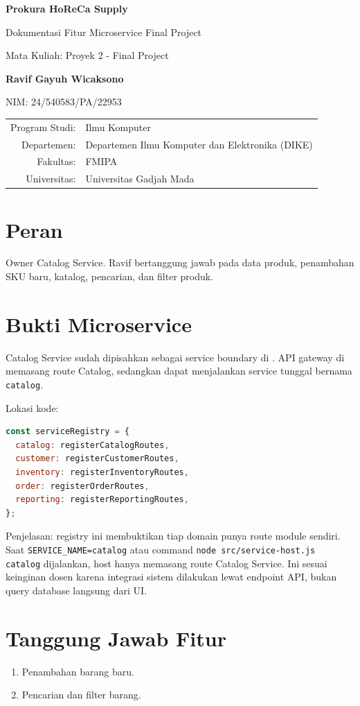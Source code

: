 \documentclass[11pt,a4paper]{article}
\newcommand{\docheader}[2]{
\begin{titlepage}
\centering
{\Large\bfseries Prokura HoReCa Supply\par}
\vspace{0.4cm}
{\large Dokumentasi Fitur Microservice Final Project\par}
\vspace{0.8cm}
{\large Mata Kuliah: Proyek 2 - Final Project\par}
\vspace{1.2cm}
{\large\bfseries #1\par}
{\large NIM: #2\par}
\vfill
\begin{tabular}{rl}
Program Studi: & Ilmu Komputer\\
Departemen: & Departemen Ilmu Komputer dan Elektronika (DIKE)\\
Fakultas: & FMIPA\\
Universitas: & Universitas Gadjah Mada\\
\end{tabular}
\vfill
\end{titlepage}
}
\begin{document}
\docheader{Ravif Gayuh Wicaksono}{24/540583/PA/22953}

\section*{Peran}
Owner Catalog Service. Ravif bertanggung jawab pada data produk, penambahan SKU baru, katalog, pencarian, dan filter produk.

\section*{Bukti Microservice}
Catalog Service sudah dipisahkan sebagai service boundary di . API gateway di  memasang route Catalog, sedangkan  dapat menjalankan service tunggal bernama \texttt{catalog}.

Lokasi kode: 

\begin{lstlisting}[language=JavaScript]
const serviceRegistry = {
  catalog: registerCatalogRoutes,
  customer: registerCustomerRoutes,
  inventory: registerInventoryRoutes,
  order: registerOrderRoutes,
  reporting: registerReportingRoutes,
};
\end{lstlisting}

Penjelasan: registry ini membuktikan tiap domain punya route module sendiri. Saat \texttt{SERVICE\_NAME=catalog} atau command \texttt{node src/service-host.js catalog} dijalankan, host hanya memasang route Catalog Service. Ini sesuai keinginan dosen karena integrasi sistem dilakukan lewat endpoint API, bukan query database langsung dari UI.

\section*{Tanggung Jawab Fitur}
\begin{enumerate}
\item Penambahan barang baru.
\item Pencarian dan filter barang.
\end{enumerate}
\end{document}
